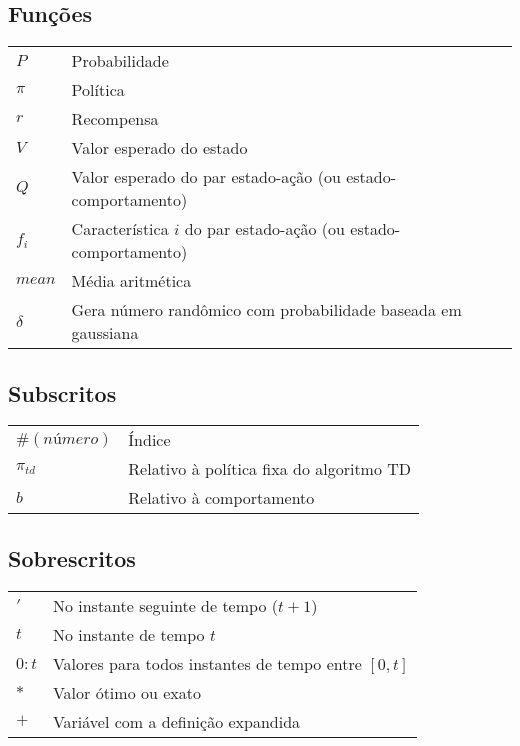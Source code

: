 \subsection*{Funções}

\begin{tabular}{p{}p{}}
$P$ & Probabilidade\tabularnewline
$\pi$ & Política\tabularnewline
$r$ & Recompensa\tabularnewline
$V$ & Valor esperado do estado\tabularnewline
$Q$ & Valor esperado do par estado-ação (ou estado-comportamento)\tabularnewline
$f_i$ & Característica $ i $ do par estado-ação (ou estado-comportamento)\tabularnewline
$mean$ & Média aritmética\tabularnewline
$\delta$  & Gera número randômico com probabilidade baseada em gaussiana \tabularnewline
\end{tabular}


\subsection*{Subscritos}

\begin{tabular}{p{}p{}}
$\#(\textit{número})$  & Índice \tabularnewline
$\pi_{td}$  & Relativo à política fixa do algoritmo TD \tabularnewline
$b$  & Relativo à comportamento \tabularnewline
\end{tabular}


\subsection*{Sobrescritos}

\begin{tabular}{p{}p{}}
$'$  & No instante seguinte de tempo ($ t+1 $) \tabularnewline
$t$  & No instante de tempo $ t $ \tabularnewline
$0:t$  & Valores para todos instantes de tempo entre $\left[0, t\right]$ \tabularnewline
$*$  & Valor ótimo ou exato \tabularnewline
$+$  & Variável com a definição expandida \tabularnewline
\end{tabular}

